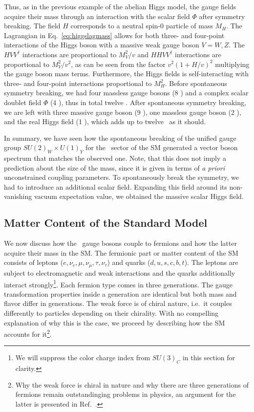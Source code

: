 Thus, as in the previous example of the abelian Higgs model, the gauge
fields acquire their mass through an interaction with the scalar
field $\Phi$ after symmetry breaking. The field $H$ corresponds to a
neutral spin-0 particle of mass $M_H$. The Lagrangian in
Eq.~\eqref{eq:higgslagmass} allows for both three- and four-point
interactions of the Higgs boson with a massive weak gauge boson $V=W,Z$. The
$HVV^\dagger$ interactions are proportional to $M_V^2/v$ and
$HHVV^\dagger$ interactions are proportional to $M_V^2/v^2$, as can be
seen from the factor $v^2(1+H/v)^2$ multiplying the gauge boson mass
terms. Furthermore, the Higgs fields is self-interacting with three-
and four-point interactions proportional to $M_H^2$. Before
spontaneous symmetry breaking, we had four massless gauge bosons (8
\dof) and a complex scalar doublet
field $\Phi$ (4 \dof), thus in total twelve \dof. After spontaneous symmetry
breaking, we are left with three massive gauge boson (9 \dof), one
massless gauge boson (2 \dof), and the real Higgs field (1 \dof), which adds up to twelve \dof~as it should.


In summary, we have seen how the spontaneous breaking of the unified
gauge group $SU(2)_W\times U(1)_Y$ for the \ew~sector of the SM
generated a vector boson spectrum that matches the observed
one. Note, that this does not imply a
  prediction about the size of the mass, since it is given in terms of
  \textit{a priori} unconstrained coupling parameters. To spontaneously break the symmetry, we had to introduce an
additional scalar field. Expanding this field around its non-vanishing
vacuum expectation value, we obtained the massive scalar Higgs field. 

\subsection{Matter Content of the Standard Model}
\label{sec:mattercont}
We now discuss how the \ew~gauge bosons couple to fermions and how the
latter acquire their mass in the SM. The fermionic part or matter
content of the SM consists of
leptons ($e,\nu_e,\mu,\nu_\mu,\tau,\nu_\tau$) and quarks
($d,u,s,c,b,t$). The leptons are subject to electromagnetic and weak
interactions and the quarks additionally interact
strongly\footnote{We will suppress the color charge index from
  $SU(3)_C$ in this section for
clarity.}. Each fermion type comes in three generations. The
gauge transformation properties inside a generation are identical but
both mass and flavor differ in generations. The weak force is of chiral nature,
i.e.\ it couples
differently to particles depending on their chirality. With no compelling explanation of why this is the case,
we proceed by describing how the SM accounts for it\footnote{Why the weak force is
  chiral in nature and why
  there are three generations of fermions remain outstandinging problems in physics, an argument for the latter is presented in Ref.~\cite{vanderBij:2007fe}.}.


